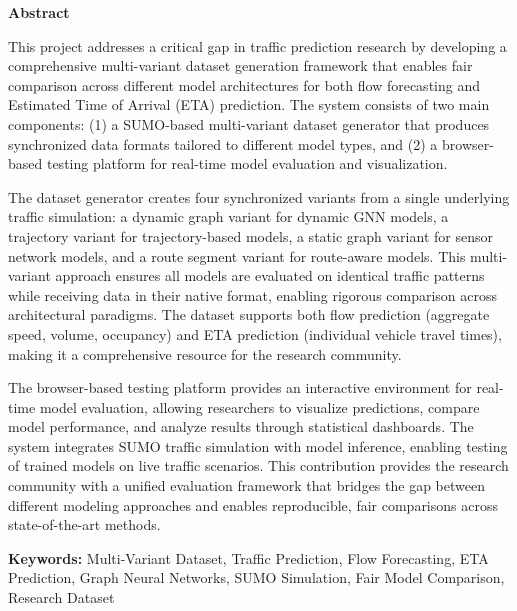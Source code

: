 \begin{center}
{\large\bfseries Abstract}
\end{center}

\vspace{1em}

This project addresses a critical gap in traffic prediction research by developing a comprehensive multi-variant dataset generation framework that enables fair comparison across different model architectures for both flow forecasting and Estimated Time of Arrival (ETA) prediction. The system consists of two main components: (1) a SUMO-based multi-variant dataset generator that produces synchronized data formats tailored to different model types, and (2) a browser-based testing platform for real-time model evaluation and visualization.

The dataset generator creates four synchronized variants from a single underlying traffic simulation: a dynamic graph variant for dynamic GNN models, a trajectory variant for trajectory-based models, a static graph variant for sensor network models, and a route segment variant for route-aware models. This multi-variant approach ensures all models are evaluated on identical traffic patterns while receiving data in their native format, enabling rigorous comparison across architectural paradigms. The dataset supports both flow prediction (aggregate speed, volume, occupancy) and ETA prediction (individual vehicle travel times), making it a comprehensive resource for the research community.

The browser-based testing platform provides an interactive environment for real-time model evaluation, allowing researchers to visualize predictions, compare model performance, and analyze results through statistical dashboards. The system integrates SUMO traffic simulation with model inference, enabling testing of trained models on live traffic scenarios. This contribution provides the research community with a unified evaluation framework that bridges the gap between different modeling approaches and enables reproducible, fair comparisons across state-of-the-art methods.

\vspace{1em}

\noindent\textbf{Keywords:} Multi-Variant Dataset, Traffic Prediction, Flow Forecasting, ETA Prediction, Graph Neural Networks, SUMO Simulation, Fair Model Comparison, Research Dataset

